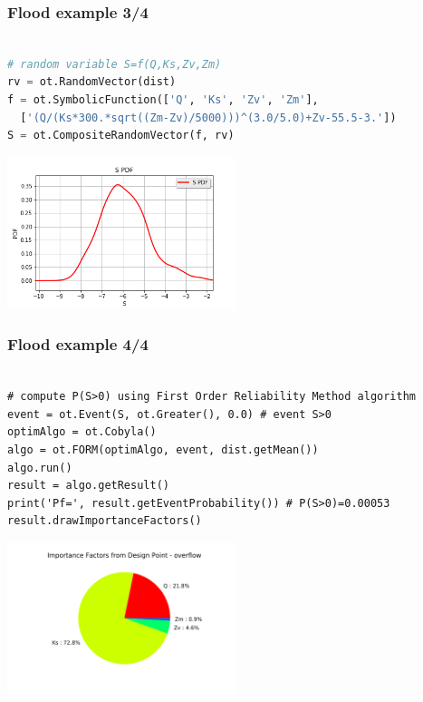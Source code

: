\documentclass{beamer}
\begin{document}
\begin{frame}[containsverbatim]
\frametitle{Flood example 3/4}
\begin{adjustbox}{max width=\linewidth, margin=0pt}
\begin{lstlisting}[language=Python,basicstyle=\ttfamily,keywordstyle=\color{red}]

# random variable S=f(Q,Ks,Zv,Zm)
rv = ot.RandomVector(dist)
f = ot.SymbolicFunction(['Q', 'Ks', 'Zv', 'Zm'],
  ['(Q/(Ks*300.*sqrt((Zm-Zv)/5000)))^(3.0/5.0)+Zv-55.5-3.'])
S = ot.CompositeRandomVector(f, rv)
\end{lstlisting}
\end{adjustbox}

\begin{center}
\includegraphics[width=0.5\textwidth]{figures/s_dist}
\end{center}

\end{frame}








\begin{frame}[containsverbatim]
\frametitle{Flood example 4/4}

\begin{adjustbox}{max width=0.8\linewidth, margin=0pt}
\begin{lstlisting}

# compute P(S>0) using First Order Reliability Method algorithm
event = ot.Event(S, ot.Greater(), 0.0) # event S>0
optimAlgo = ot.Cobyla()
algo = ot.FORM(optimAlgo, event, dist.getMean())
algo.run()
result = algo.getResult()
print('Pf=', result.getEventProbability()) # P(S>0)=0.00053
result.drawImportanceFactors()
\end{lstlisting}
\end{adjustbox}
\begin{center}
\includegraphics[width=0.5\textwidth]{figures/imp_fact}
\end{center}

\end{frame}
\end{document}
